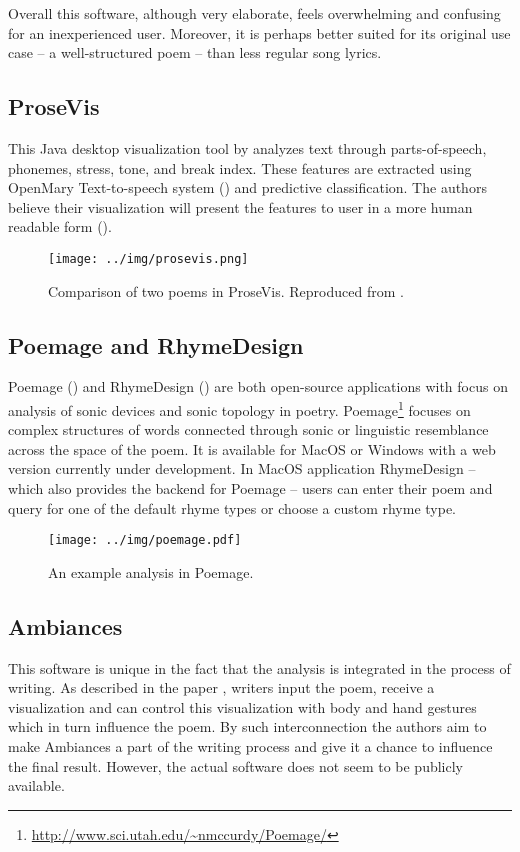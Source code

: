 Overall this software, although very elaborate, feels overwhelming and confusing for an inexperienced user. Moreover, it is perhaps better suited for its original use case -- a well-structured poem -- than less regular song lyrics.


\subsection*{ProseVis}
This Java desktop visualization tool by \cite{Clement2013} analyzes text through
parts-of-speech, phonemes, stress, tone, and break index. These features are extracted using OpenMary Text-to-speech system (\cite{Schroder2006}) and predictive classification. The authors believe their visualization will present the features to user in a more human readable form (\cite{prosevis2017sourceforge}).

\begin{figure}[h]\centering
	\texttt{[image: ../img/prosevis.png]}
	\caption[Comparison of two poems in ProseVis]{Comparison of two poems in ProseVis. Reproduced from \cite{prosevis2017sourceforge}.}\label{screenshotProsevis}
\end{figure}

\subsection*{Poemage and RhymeDesign}
Poemage (\cite{McCurdy2015poemage}) and RhymeDesign (\cite{McCurdy2015}) are both open-source applications with focus on analysis of sonic devices and sonic topology in poetry. Poemage\footnote{\url{http://www.sci.utah.edu/~nmccurdy/Poemage/}} focuses on complex structures of words connected through sonic or linguistic resemblance across the space of the poem. It is available for MacOS or Windows with a web version currently under development. In MacOS application RhymeDesign -- which also provides the backend for Poemage -- users can enter their poem and query for one of the default rhyme types or choose a custom rhyme type.

\begin{figure}[h]\centering
	\texttt{[image: ../img/poemage.pdf]}
	\caption{An example analysis in Poemage.}\label{screenshotPoemage}
\end{figure}

\subsection*{Ambiances}
This software is unique in the fact that the analysis is integrated in the process of writing. As described in the paper \cite{Meneses2015}, writers input the poem, receive a visualization and can control this visualization with body and hand gestures which in turn influence the poem. By such interconnection the authors aim to make Ambiances a part of the writing process and give it a chance to influence the final result. However, the actual software does not seem to be publicly available.


